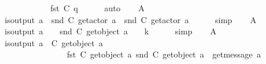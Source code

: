 \begin{isabellebody}
\ \ \ \ \ \ \ \ \ \ \ \ {\isachardoublequoteopen}fst\ {\isacharparenleft}{\kern0pt}C{}\ q{\isacharparenright}{\kern0pt}{\isachardoublequoteclose}{\isacharbrackright}{\kern0pt}\isanewline
\ \ \ \ \isamarkupfalse%
\ auto\isanewline
\ \ \isamarkupfalse%
\ A{}\ \isamarkupfalse%
\ {\isachardoublequoteopen}is{\isacharunderscore}{\kern0pt}output\ a\ {\isasymLongrightarrow}\ snd\ {\isacharparenleft}{\kern0pt}C{}\ {\isacharparenleft}{\kern0pt}get{\isacharunderscore}{\kern0pt}actor\ a{\isacharparenright}{\kern0pt}{\isacharparenright}{\kern0pt}\ {\isacharequal}{\kern0pt}\ snd\ {\isacharparenleft}{\kern0pt}C{}\ {\isacharparenleft}{\kern0pt}get{\isacharunderscore}{\kern0pt}actor\ a{\isacharparenright}{\kern0pt}{\isacharparenright}{\kern0pt}{\isachardoublequoteclose}\isanewline
\ \ \ \ \isamarkupfalse%
\ simp\isanewline
\ \ \isamarkupfalse%
\ A{}\ \isamarkupfalse%
\ {\isachardoublequoteopen}is{\isacharunderscore}{\kern0pt}output\ a\ {\isasymLongrightarrow}\ {\isacharparenleft}{\kern0pt}\ {\isacharbar}{\kern0pt}\ {\isacharparenleft}{\kern0pt}snd\ {\isacharparenleft}{\kern0pt}C{}\ {\isacharparenleft}{\kern0pt}get{\isacharunderscore}{\kern0pt}object\ a{\isacharparenright}{\kern0pt}{\isacharparenright}{\kern0pt}{\isacharparenright}{\kern0pt}\ {\isacharbar}{\kern0pt}\ {\isacharparenright}{\kern0pt}\ {\isacharless}{\kern0pt}\isactrlsub {\isasymB}\ k{\isachardoublequoteclose}\isanewline
\ \ \ \ \isamarkupfalse%
\ simp\isanewline
\ \ \isamarkupfalse%
\ A{}\ \isamarkupfalse%
\ {\isachardoublequoteopen}is{\isacharunderscore}{\kern0pt}output\ a\ {\isasymLongrightarrow}\ C{}\ {\isacharparenleft}{\kern0pt}get{\isacharunderscore}{\kern0pt}object\ a{\isacharparenright}{\kern0pt}\ {\isacharequal}{\kern0pt}\isanewline
\ \ \ \ \ \ \ \ \ \ \ \ \ \ \ \ {\isacharparenleft}{\kern0pt}fst\ {\isacharparenleft}{\kern0pt}C{}\ {\isacharparenleft}{\kern0pt}get{\isacharunderscore}{\kern0pt}object\ a{\isacharparenright}{\kern0pt}{\isacharparenright}{\kern0pt}{\isacharcomma}{\kern0pt}\ {\isacharparenleft}{\kern0pt}snd\ {\isacharparenleft}{\kern0pt}C{}\ {\isacharparenleft}{\kern0pt}get{\isacharunderscore}{\kern0pt}object\ a{\isacharparenright}{\kern0pt}{\isacharparenright}{\kern0pt}{\isacharparenright}{\kern0pt}\ {\isasymcdot}\ {\isacharbrackleft}{\kern0pt}get{\isacharunderscore}{\kern0pt}message\ a{\isacharbrackright}{\kern0pt}{\isacharparenright}{\kern0pt}{\isachardoublequoteclose}\isanewline

\end{isabellebody}
